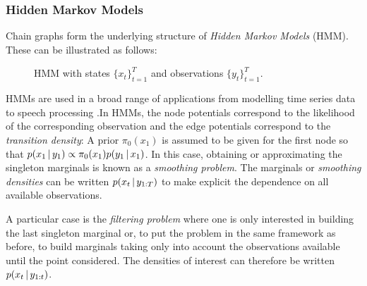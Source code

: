 \subsubsection{Hidden Markov Models}
Chain graphs form the underlying structure of \emph{Hidden Markov Models} (HMM). These can be illustrated as follows:
\begin{figure}[!h]
\center
{}
\caption{\label{fig: hmm1} HMM with states $\{x_{t}\}_{t=1}^{T}$ and observations $\{y_{t}\}_{t=1}^{T}$.}
\end{figure}

HMMs are used in a broad range of applications from modelling time series data to speech processing \citep{ghahramani01}.\addref In HMMs, the node potentials correspond to the likelihood of the corresponding observation and the edge potentials correspond to the \emph{transition density}:\addref
{}
A prior $\pi_{0}(x_{1})$ is assumed to be given for the first node so that $p(x_1\,|\, y_{1}) \propto \pi_{0}(x_1)p(y_1\,|\, x_1)$. In this case, obtaining or approximating the singleton marginals is known as a \emph{smoothing problem}. The marginals or \emph{smoothing densities} can be written $p(x_t\,|\, y_{1:T})$ to make explicit the dependence on all available observations.

A particular case is the \emph{filtering problem} where one is only interested in building the last singleton marginal or, to put the problem in the same framework as before, to build marginals taking only into account the observations available until the point considered. The densities of interest can therefore be written $p(x_t\,|\, y_{1:t})$.


